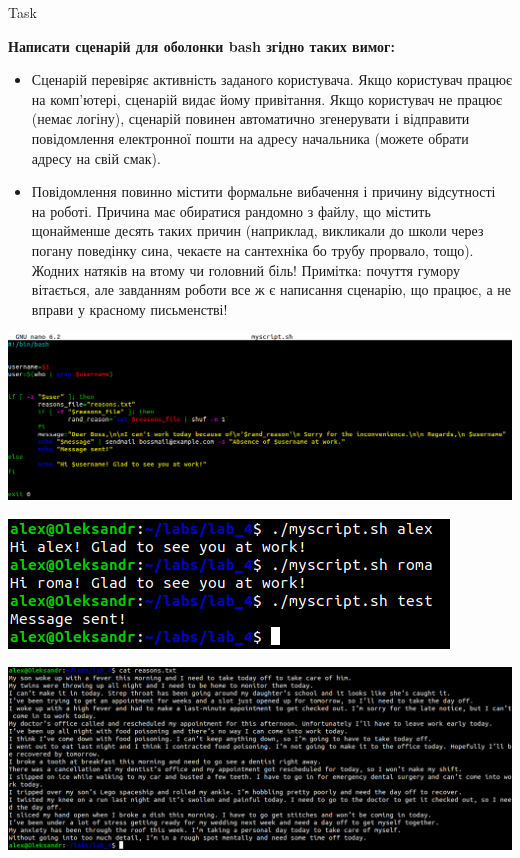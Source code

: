 \documentclass[a4paper,12pt]{article}
\newcommand{\RomanNumeralCaps}[1]{\MakeUppercase{\romannumeral #1}}
\begin{document}
\newpage
    \begin{center}
        \Large{Task \RomanNumeralCaps{1}}
    \end{center}
    \textbf{Написати сценарій для оболонки bash згідно таких вимог:}
    \begin{itemize}
        \item Сценарій перевіряє активність заданого користувача. Якщо користувач працює на комп’ютері, сценарій видає йому привітання. Якщо користувач не працює (немає
        логіну), сценарій повинен автоматично згенерувати і відправити повідомлення електронної пошти на адресу начальника (можете обрати адресу на свій смак).
        \item Повідомлення повинно містити формальне вибачення і причину відсутності на роботі. Причина має обиратися рандомно з файлу, що містить щонайменше десять таких
        причин (наприклад, викликали до школи через погану поведінку сина, чекаєте на сантехніка бо трубу прорвало, тощо). Жодних натяків на втому чи головний біль! 
        Примітка: почуття гумору вітається, але завданням роботи все ж є написання сценарію, що працює, а не вправи у красному письменстві!
    \end{itemize}
    \begin{minipage}[h]{1\linewidth}
        \centering
        \includegraphics[width=0.9\linewidth]{Prt sc/Figure_1.png}  
    \end{minipage}
    \begin{minipage}[h]{1\linewidth}
        \centering
        \includegraphics[width=0.9\linewidth]{Prt sc/Figure_2.png}  
    \end{minipage}
    \begin{minipage}[h]{1\linewidth}
        \centering
        \includegraphics[width=0.9\linewidth]{Prt sc/Figure_3.png}  
    \end{minipage}
\end{document}
